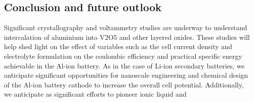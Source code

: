 \subsection{Conclusion and future outlook}
Significant crystallography and voltammetry studies are underway to understand intercalation of aluminium into V2O5 and other layered oxides. These studies will help
shed light on the effect of variables such as the cell current
density and electrolyte formulation on the coulombic efficiency
and practical specific energy achievable in the Al-ion battery. As in the case of Li-ion secondary batteries, we anticipate significant opportunities for nanoscale engineering and chemical design of the Al-ion battery cathode to increase the overall cell potential. Additionally, we anticipate as significant efforts to pioneer ionic liquid and
